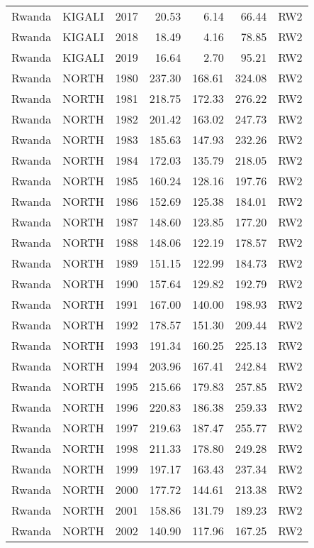 \begin{longtable}{lllrrrl}
  Rwanda & KIGALI & 2017 & 20.53 & 6.14 & 66.44 & RW2 \\ 
  Rwanda & KIGALI & 2018 & 18.49 & 4.16 & 78.85 & RW2 \\ 
  Rwanda & KIGALI & 2019 & 16.64 & 2.70 & 95.21 & RW2 \\ 
  Rwanda & NORTH & 1980 & 237.30 & 168.61 & 324.08 & RW2 \\ 
  Rwanda & NORTH & 1981 & 218.75 & 172.33 & 276.22 & RW2 \\ 
  Rwanda & NORTH & 1982 & 201.42 & 163.02 & 247.73 & RW2 \\ 
  Rwanda & NORTH & 1983 & 185.63 & 147.93 & 232.26 & RW2 \\ 
  Rwanda & NORTH & 1984 & 172.03 & 135.79 & 218.05 & RW2 \\ 
  Rwanda & NORTH & 1985 & 160.24 & 128.16 & 197.76 & RW2 \\ 
  Rwanda & NORTH & 1986 & 152.69 & 125.38 & 184.01 & RW2 \\ 
  Rwanda & NORTH & 1987 & 148.60 & 123.85 & 177.20 & RW2 \\ 
  Rwanda & NORTH & 1988 & 148.06 & 122.19 & 178.57 & RW2 \\ 
  Rwanda & NORTH & 1989 & 151.15 & 122.99 & 184.73 & RW2 \\ 
  Rwanda & NORTH & 1990 & 157.64 & 129.82 & 192.79 & RW2 \\ 
  Rwanda & NORTH & 1991 & 167.00 & 140.00 & 198.93 & RW2 \\ 
  Rwanda & NORTH & 1992 & 178.57 & 151.30 & 209.44 & RW2 \\ 
  Rwanda & NORTH & 1993 & 191.34 & 160.25 & 225.13 & RW2 \\ 
  Rwanda & NORTH & 1994 & 203.96 & 167.41 & 242.84 & RW2 \\ 
  Rwanda & NORTH & 1995 & 215.66 & 179.83 & 257.85 & RW2 \\ 
  Rwanda & NORTH & 1996 & 220.83 & 186.38 & 259.33 & RW2 \\ 
  Rwanda & NORTH & 1997 & 219.63 & 187.47 & 255.77 & RW2 \\ 
  Rwanda & NORTH & 1998 & 211.33 & 178.80 & 249.28 & RW2 \\ 
  Rwanda & NORTH & 1999 & 197.17 & 163.43 & 237.34 & RW2 \\ 
  Rwanda & NORTH & 2000 & 177.72 & 144.61 & 213.38 & RW2 \\ 
  Rwanda & NORTH & 2001 & 158.86 & 131.79 & 189.23 & RW2 \\ 
  Rwanda & NORTH & 2002 & 140.90 & 117.96 & 167.25 & RW2 \\ 

\end{longtable}
